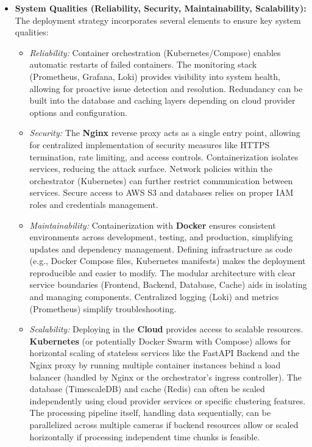 \begin{itemize}
    \item \textbf{System Qualities (Reliability, Security, Maintainability, Scalability):}
        The deployment strategy incorporates several elements to ensure key system qualities:
        \begin{itemize}
            \item \textit{Reliability:} Container orchestration (Kubernetes/Compose) enables automatic restarts of failed containers. The monitoring stack (Prometheus, Grafana, Loki) provides visibility into system health, allowing for proactive issue detection and resolution. Redundancy can be built into the database and caching layers depending on cloud provider options and configuration.
            \item \textit{Security:} The \textbf{Nginx} reverse proxy acts as a single entry point, allowing for centralized implementation of security measures like HTTPS termination, rate limiting, and access controls. Containerization isolates services, reducing the attack surface. Network policies within the orchestrator (Kubernetes) can further restrict communication between services. Secure access to AWS S3 and databases relies on proper IAM roles and credentials management.
            \item \textit{Maintainability:} Containerization with \textbf{Docker} ensures consistent environments across development, testing, and production, simplifying updates and dependency management. Defining infrastructure as code (e.g., Docker Compose files, Kubernetes manifests) makes the deployment reproducible and easier to modify. The modular architecture with clear service boundaries (Frontend, Backend, Database, Cache) aids in isolating and managing components. Centralized logging (Loki) and metrics (Prometheus) simplify troubleshooting.
            \item \textit{Scalability:} Deploying in the \textbf{Cloud} provides access to scalable resources. \textbf{Kubernetes} (or potentially Docker Swarm with Compose) allows for horizontal scaling of stateless services like the FastAPI Backend and the Nginx proxy by running multiple container instances behind a load balancer (handled by Nginx or the orchestrator's ingress controller). The database (TimescaleDB) and cache (Redis) can often be scaled independently using cloud provider services or specific clustering features. The processing pipeline itself, handling data sequentially, can be parallelized across multiple cameras if backend resources allow or scaled horizontally if processing independent time chunks is feasible.
        \end{itemize}
\end{itemize}

